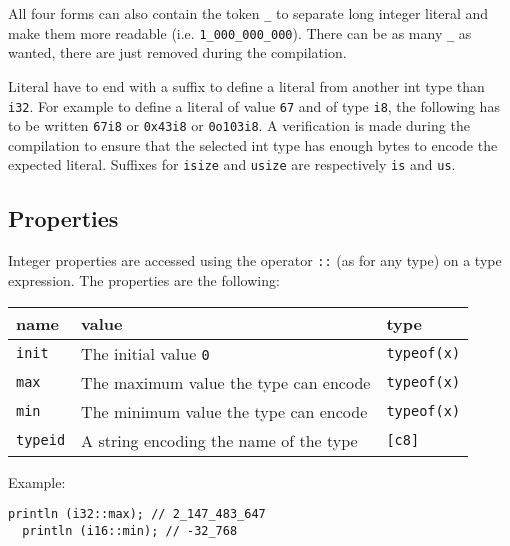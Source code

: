 All four forms can also contain the token \texttt{\_} to separate long integer literal
and make them more readable (i.e. \texttt{1\_000\_000\_000}). There can be as many \texttt{\_} as
wanted, there are just removed during the compilation.

Literal have to end with a suffix to define a literal from another int type than
\texttt{i32}. For example to define a literal of value \texttt{67} and of type \texttt{i8}, the
following has to be written \texttt{67i8} or \texttt{0x43i8} or \texttt{0o103i8}. A verification is
made during the compilation to ensure that the selected int type has enough
bytes to encode the expected literal. Suffixes for \texttt{isize} and \texttt{usize} are
respectively \texttt{is} and \texttt{us}.

\subsection{Properties}
\label{sec:orgc02cb40}

Integer properties are accessed using the operator \texttt{::} (as for any type) on a type expression. The properties are the following:

\begin{center}
  \vspace{-3pt}
  \begin{adjustbox}{max width=\linewidth}
    \begin{tabular}{|l|ll|}
      \hline
      name & value & type\\[0pt]
      \hline
      \hline
      \texttt{init} & The initial value \texttt{0} & \texttt{typeof(x)}\\[0pt]
      \texttt{max} & The maximum value the type can encode & \texttt{typeof(x)}\\[0pt]
      \texttt{min} & The minimum value the type can encode & \texttt{typeof(x)}\\[0pt]
      \hline
      \texttt{typeid} & A string encoding the name of the type & \texttt{[c8]}\\[0pt]
      \hline
    \end{tabular}
  \end{adjustbox}
\end{center}

\smallskip

Example:
\smallskip

\begin{lstlisting}[style=coloredverbatim]
  println (i32::max); // 2_147_483_647
  println (i16::min); // -32_768
\end{lstlisting}

